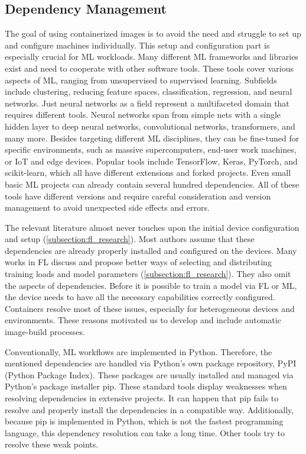 \subsection{Dependency Management}

The goal of using containerized images is to avoid the need and struggle to set up and configure machines individually.
This setup and configuration part is especially crucial for ML workloads.
Many different ML frameworks and libraries exist and need to cooperate with other software tools.
These tools cover various aspects of ML, ranging from unsupervised to supervised learning.
Subfields include clustering, reducing feature spaces, classification, regression, and neural networks.
Just neural networks as a field represent a multifaceted domain that requires different tools.
Neural networks span from simple nets with a single hidden layer to deep neural networks, convolutional networks, transformers, and many more.
Besides targeting different ML disciplines, they can be fine-tuned for specific environments, such as massive supercomputers, end-user work machines, or IoT and edge devices.
Popular tools include TensorFlow, Keras, PyTorch, and scikit-learn, which all have different extensions and forked projects.
Even small basic ML projects can already contain several hundred dependencies.
All of these tools have different versions and require careful consideration and version management to avoid unexpected side effects and errors.

The relevant literature almost never touches upon the initial device configuration and setup (\ref{subsection:fl_research}).
Most authors assume that these dependencies are already properly installed and configured on the devices.
Many works in FL discuss and propose better ways of selecting and distributing training loads and model parameters (\ref{subsection:fl_research}).
They also omit the aspects of dependencies.
Before it is possible to train a model via FL or ML, the device needs to have all the necessary capabilities correctly configured.
Containers resolve most of these issues, especially for heterogeneous devices and environments.
These reasons motivated us to develop and include automatic image-build processes.

Conventionally, ML workflows are implemented in Python.
Therefore, the mentioned dependencies are handled via Python's own package repository, PyPI (Python Package Index).
These packages are usually installed and managed via Python's package installer pip.
These standard tools display weaknesses when resolving dependencies in extensive projects.
It can happen that pip fails to resolve and properly install the dependencies in a compatible way.
Additionally, because pip is implemented in Python, which is not the fastest programming language, this dependency resolution can take a long time.
Other tools try to resolve these weak points.

